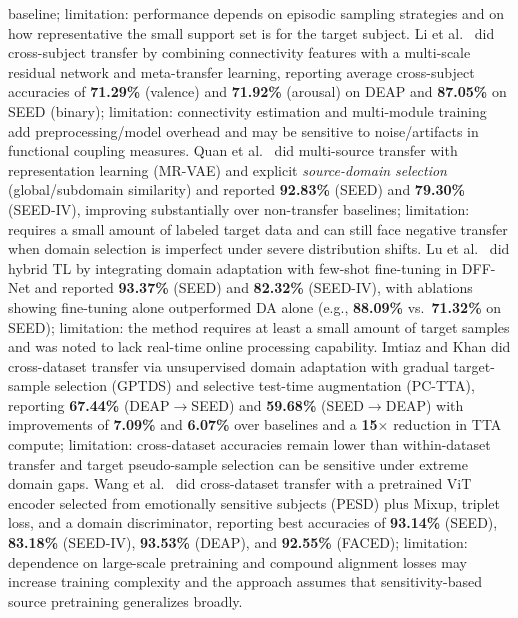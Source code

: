 \documentclass{WileyMSP-template}
\begin{document}
baseline; limitation: performance depends on episodic sampling strategies and on how representative the small support set is for the target subject. Li et al.\ \cite{li2022compbiomed_metatransfer_connectivity} did cross-subject transfer by combining connectivity features with a multi-scale residual network and meta-transfer learning, reporting average cross-subject accuracies of \textbf{71.29\%} (valence) and \textbf{71.92\%} (arousal) on DEAP and \textbf{87.05\%} on SEED (binary); limitation: connectivity estimation and multi-module training add preprocessing/model overhead and may be sensitive to noise/artifacts in functional coupling measures. Quan et al.\ \cite{quan2023bspc_multisource_transfer} did multi-source transfer with representation learning (MR-VAE) and explicit \emph{source-domain selection} (global/subdomain similarity) and reported \textbf{92.83\%} (SEED) and \textbf{79.30\%} (SEED-IV), improving substantially over non-transfer baselines; limitation: requires a small amount of labeled target data and can still face negative transfer when domain selection is imperfect under severe distribution shifts. Lu et al.\ \cite{lu2023frontiers_dffnet} did hybrid TL by integrating domain adaptation with few-shot fine-tuning in DFF-Net and reported \textbf{93.37\%} (SEED) and \textbf{82.32\%} (SEED-IV), with ablations showing fine-tuning alone outperformed DA alone (e.g., \textbf{88.09\%} vs.\ \textbf{71.32\%} on SEED); limitation: the method requires at least a small amount of target samples and was noted to lack real-time online processing capability. Imtiaz and Khan \cite{imtiaz2025compbiomed_uda_gptds} did cross-dataset transfer via unsupervised domain adaptation with gradual target-sample selection (GPTDS) and selective test-time augmentation (PC-TTA), reporting \textbf{67.44\%} (DEAP$\rightarrow$SEED) and \textbf{59.68\%} (SEED$\rightarrow$DEAP) with improvements of \textbf{7.09\%} and \textbf{6.07\%} over baselines and a \textbf{15$\times$} reduction in TTA compute; limitation: cross-dataset accuracies remain lower than within-dataset transfer and target pseudo-sample selection can be sensitive under extreme domain gaps. Wang et al.\ \cite{wang2025eswa_pesd} did cross-dataset transfer with a pretrained ViT encoder selected from emotionally sensitive subjects (PESD) plus Mixup, triplet loss, and a domain discriminator, reporting best accuracies of \textbf{93.14\%} (SEED), \textbf{83.18\%} (SEED-IV), \textbf{93.53\%} (DEAP), and \textbf{92.55\%} (FACED); limitation: dependence on large-scale pretraining and compound alignment losses may increase training complexity and the approach assumes that sensitivity-based source pretraining generalizes broadly.
\end{document}
